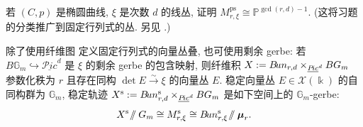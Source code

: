 \begin{exercise}[困难]\label{src:9.2.31}
若 $(C,p)$ 是椭圆曲线, $\xi$ 是次数 $d$ 的线丛, 证明 $M_{r,\xi}^{\mathrm{ps}}\cong\mathbb P^{\gcd(r,d)-1}$. (这将习题~ 的分类推广到固定行列式的丛. 另见 \cite[定理 3]{Tu93}.)
\end{exercise}
\begin{remark}\label{src:9.2.32}
除了使用纤维图  定义固定行列式的向量丛叠, 也可使用剩余 gerbe: 若 $B\mathbb G_m\hookrightarrow\underline{\mathcal P\!ic}^d$ 是 $\xi$ 的剩余 gerbe 的包含映射, 则纤维积 $X:=B\!un_{r,d}\times_{\underline{P\!ic}^d}BG_m$ 参数化秩为 $r$ 且存在同构 $\det E\xrightarrow{\sim}\xi$ 的向量丛 $E$. 稳定向量丛 $E\in\mathcal X(\Bbbk)$ 的自同构群为 $\mathbb G_m$, 稳定轨迹 $X^{\mathrm s}:=B\!un_{r,d}^{\mathrm s}\times_{\underline{P\!ic}^d}BG_m$ 是如下空间上的 $\mathbb G_m$-gerbe:
\[
X^{\mathrm s}\!\mathbin{/\mkern-6mu/}G_m\cong M_{r,\xi}^{\mathrm s}
\cong B\!un_{r,\xi}^{\mathrm s}\!\mathbin{/\mkern-6mu/}\boldsymbol\mu_r.
\]
\end{remark}
